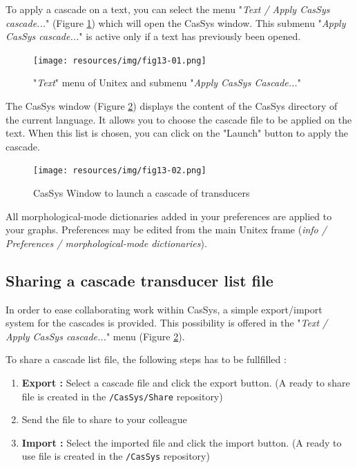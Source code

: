 To apply a cascade on a text, you can select the menu "\textit{Text / Apply CasSys cascade...}" (Figure \ref{fig13-01}) which will open the CasSys window.
This submenu "\textit{Apply CasSys cascade...}" is active only if a text has previously been opened.

\begin{figure}[!htb]
 \centering
 \texttt{[image: resources/img/fig13-01.png]}
 \caption{"\textit{Text}" menu of Unitex and submenu "\textit{Apply CasSys Cascade...}"}
 \label{fig13-01}
\end{figure}


The CasSys window (Figure \ref{fig13-02}) displays the content of the CasSys directory of the current language. It allows you to choose 
the cascade file to be applied on the text. When this list is chosen, you can click on the "Launch" button to apply the cascade.

\begin{figure}[!htb]
  \centering
  \texttt{[image: resources/img/fig13-02.png]}
  \caption{CasSys Window to launch a cascade of transducers}
  \label{fig13-02}
\end{figure}

All morphological-mode dictionaries added in your preferences are applied to your
graphs. Preferences may be edited from the main Unitex frame (\textit{info / Preferences / morphological-mode dictionaries}).

\subsection{Sharing a cascade transducer list file}
\label{subsec:shareCascade}

In order to ease collaborating work within CasSys, a  simple export/import
system for the cascades is provided. This possibility is offered in the "\textit{Text / Apply CasSys cascade...}" menu (Figure \ref{fig13-02}).

To share a cascade list file, the following steps has to be fullfilled :
\begin{enumerate}
  \item \textbf{Export :} Select a cascade file and click the export button. (A
  ready to share file is created in the \texttt{/CasSys/Share} repository)
  \item Send the file to share to your colleague
  \item \textbf{Import :} Select the imported file and click the import button.
  (A ready to use file is created in the \texttt{/CasSys} repository)
\end{enumerate}


